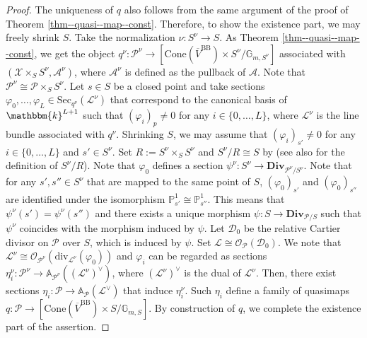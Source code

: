 \documentclass[12pt,twoside]{amsart}
\theoremstyle{definition}
\begin{document}
\begin{proof}
The uniqueness of $q$ also follows from the same argument of the proof of Theorem \ref{thm--quasi--map--const}.
Therefore, to show the existence part, we may freely shrink $S$.
Take the normalization $\nu\colon S^\nu\to S$.
As Theorem \ref{thm--quasi--map--const}, we get the object $q^\nu\colon \mathcal{P}^\nu\to [\mathrm{Cone}(\overline{V}^{\mathrm{BB}})\times S^\nu/\mathbb{G}_{m,S^\nu}]$ associated with $(\mathcal{X}\times_SS^\nu,\mathcal{A}^\nu)$, where $\mathcal{A}^\nu$ is defined as the pullback of $\mathcal{A}$.
Note that $\mathcal{P}^\nu\cong \mathcal{P}\times_SS^\nu$.
Let $s\in S$ be a closed point and take sections $\varphi_0,\ldots,\varphi_L\in \mathrm{Sec}_{q^\nu}(\mathscr{L}^\nu)$ that correspond to the canonical basis of $\mathbbm{k}^{L+1}$ such that $(\varphi_i)_{p}\ne0$ for any $i\in\{0,\ldots,L\}$, where $\mathscr{L}^\nu$ is the line bundle associated with $q^\nu$.
Shrinking $S$, we may assume that $(\varphi_i)_{s'}\ne0$ for any $i\in\{0,\ldots,L\}$ and $s'\in S^\nu$.
Set $R:=S^\nu\times_SS^\nu$ and $S^\nu/R\cong S$ by \cite[Lemma 9.8]{kollar-mmp} (see also \cite[Definition 9.4]{kollar-mmp} for the definition of $S^\nu/R$).
Note that $\varphi_{0}$ defines a section $\psi^\nu\colon S^\nu\to \mathbf{Div}_{\mathcal{P}^\nu/S^\nu}$.
Note that for any $s',s''\in S^\nu$ that are mapped to the same point of $S$, $(\varphi_{0})_{s'}$ and $(\varphi_{0})_{s''}$ are identified under the isomorphism $\mathbb{P}^1_{s'}\cong\mathbb{P}^1_{s''}$.
This means that $\psi^\nu(s')=\psi^\nu(s'')$ and there exists a unique morphism $\psi\colon S\to \mathbf{Div}_{\mathcal{P}/S}$ such that $\psi^\nu$ coincides with the morphism induced by $\psi$.
Let $\mathcal{D}_0$ be the relative Cartier divisor on $\mathcal{P}$ over $S$, which is induced by $\psi$.
Set $\mathscr{L}\cong\mathcal{O}_{\mathcal{P}}(\mathcal{D}_0)$.
We note that $\mathscr{L}^\nu\cong \mathcal{O}_{\mathcal{P}^\nu}(\mathrm{div}_{\mathscr{L}^\nu}(\varphi_0))$ and $\varphi_i$ can be regarded as sections $\eta^\nu_i\colon\mathcal{P}^\nu\to \mathbb{A}_{\mathcal{P}^\nu}((\mathscr{L}^\nu)^\vee)$, where $(\mathscr{L}^\nu)^\vee$ is the dual of $\mathscr{L}^\nu$.
Then, there exist sections $\eta_i\colon \mathcal{P}\to \mathbb{A}_{\mathcal{P}}(\mathscr{L}^\vee)$ that induce $\eta^\nu_i$.
Such $\eta_i$ define a family of quasimaps $q\colon \mathcal{P}\to [\mathrm{Cone}(\overline{V}^{\mathrm{BB}})\times S/\mathbb{G}_{m,S}]$.
By construction of $q$, we complete the existence part of the assertion.
\end{proof}
\end{document}
